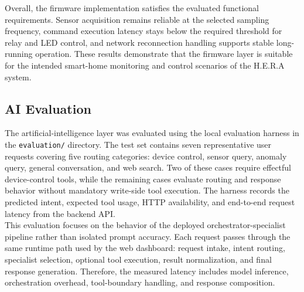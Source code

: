 Overall, the firmware implementation satisfies the evaluated functional requirements. Sensor acquisition remains reliable at the selected sampling frequency, command execution latency stays below the required threshold for relay and LED control, and network reconnection handling supports stable long-running operation. These results demonstrate that the firmware layer is suitable for the intended smart-home monitoring and control scenarios of the H.E.R.A system.


\subsection{AI Evaluation}

The artificial-intelligence layer was evaluated using the local evaluation harness in the \texttt{evaluation/} directory. The test set contains seven representative user requests covering five routing categories: device control, sensor query, anomaly query, general conversation, and web search. Two of these cases require effectful device-control tools, while the remaining cases evaluate routing and response behavior without mandatory write-side tool execution. The harness records the predicted intent, expected tool usage, HTTP availability, and end-to-end request latency from the backend API. \\

This evaluation focuses on the behavior of the deployed orchestrator-specialist pipeline rather than isolated prompt accuracy. Each request passes through the same runtime path used by the web dashboard: request intake, intent routing, specialist selection, optional tool execution, result normalization, and final response generation. Therefore, the measured latency includes model inference, orchestration overhead, tool-boundary handling, and response composition.

